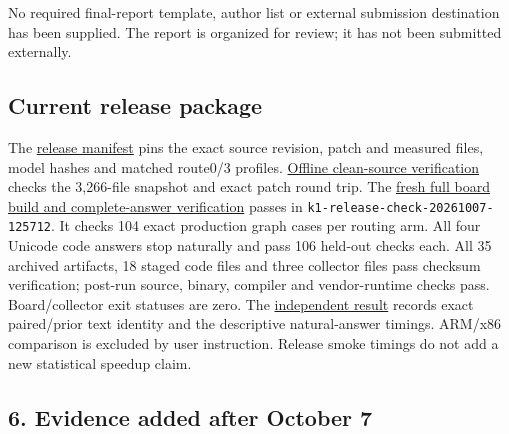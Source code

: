 \documentclass[10pt,a4paper]{article}
\begin{document}
No required final-report template, author list or external submission
destination has been supplied. The report is organized for review; it
has not been submitted externally.

\hypertarget{current-release-package}{%
\subsection{Current release package}\label{current-release-package}}

The
\href{https://github.com/MoyaMryia/riscv-accl/blob/main/spacemit/release/manifest.json}{release
manifest} pins the exact source revision, patch and measured files,
model hashes and matched route0/3 profiles.
\href{https://github.com/MoyaMryia/riscv-accl/blob/main/spacemit/reports/raw/release-20261007/clean-apply-verification.json}{Offline
clean-source verification} checks the 3,266-file snapshot and exact
patch round trip. The
\href{https://github.com/MoyaMryia/riscv-accl/blob/main/spacemit/reports/2026-10-07-release-verification.md}{fresh
full board build and complete-answer verification} passes in
\nolinkurl{k1-release-check-20261007-125712}. It checks 104 exact
production graph cases per routing arm. All four Unicode code answers
stop naturally and pass 106 held-out checks each. All 35 archived
artifacts, 18 staged code files and three collector files pass checksum
verification; post-run source, binary, compiler and vendor-runtime
checks pass. Board/collector exit statuses are zero. The
\href{https://github.com/MoyaMryia/riscv-accl/blob/main/spacemit/reports/raw/release-20261007/verification.json}{independent
result} records exact paired/prior text identity and the descriptive
natural-answer timings. ARM/x86 comparison is excluded by user
instruction. Release smoke timings do not add a new statistical speedup
claim.

\hypertarget{evidence-added-after-october-7}{%
\subsection{6. Evidence added after October
7}\label{evidence-added-after-october-7}}
\end{document}

